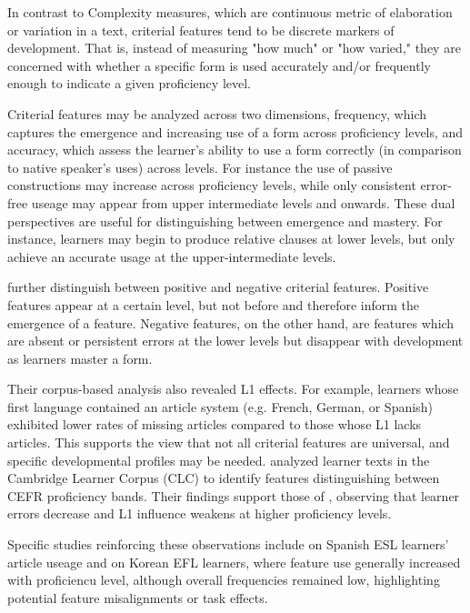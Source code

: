 In contrast to Complexity measures, which are continuous metric of
elaboration
or variation in a text, criterial features tend to be discrete markers of development. That is, instead of measuring
"how much" or "how varied," they are concerned with whether a specific form is used accurately and/or frequently
enough to
indicate a given proficiency level.

Criterial features may be analyzed across two dimensions, frequency, which captures the emergence and increasing use
of a form across proficiency levels, and accuracy, which assess the learner's ability to use a form correctly (in
comparison
to native speaker's uses) across levels. For instance the use of passive
constructions may increase across proficiency levels, while only consistent error-free useage may appear from upper
intermediate levels and onwards. These dual perspectives are useful for distinguishing between emergence and mastery. For instance, learners may
begin to produce relative clauses at lower levels, but only achieve an accurate usage at the upper-intermediate
levels.

\citet{Hawkins_Buttery_2010} further distinguish between positive and negative criterial features.
Positive features appear at a certain level, but not before and therefore inform the emergence of a
feature.
Negative features, on the other hand, are features which are absent or persistent errors at the lower levels but
disappear with development as learners master a form.

Their corpus-based analysis also revealed L1 effects. For example, learners whose
first language contained an article system (e.g. French, German, or Spanish) exhibited lower rates of missing articles
compared to those whose L1 lacks articles. This supports the view that not all criterial features are universal, and
specific developmental profiles may be needed. \citet{salamoura2010} analyzed learner texts in the Cambridge Learner
Corpus (CLC) to identify features distinguishing between CEFR proficiency bands. Their findings support those of \citet{Hawkins_Buttery_2010,diez-bedmar2015,Kim2021}, observing that learner errors decrease and L1 influence weakens at higher proficiency levels.

Specific studies reinforcing these observations include \citet{diez-bedmar2015} on Spanish ESL learners' article
useage and \citet{Kim2021} on Korean EFL learners, where feature use generally increased with proficiencu level,
although overall frequencies remained low, highlighting potential feature misalignments or task effects.

